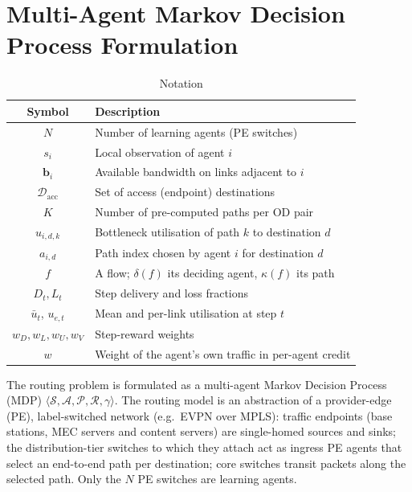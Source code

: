 \documentclass[10pt,journal,comsoc]{IEEEtran}
\begin{document}
\section{Multi-Agent Markov Decision Process Formulation} \label{model}

\begin{table}[!t]
  \centering
  \caption{Notation}
  \label{tab:mamdp_notation}
  \begin{tabular}{cl}
    \toprule
    \textbf{Symbol} & \textbf{Description} \\
    \midrule
    $N$ & Number of learning agents (PE switches) \\
    $s_i$ & Local observation of agent $i$ \\
    $\mathbf{b}_i$ & Available bandwidth on links adjacent to $i$ \\
    $\mathcal{D}_{\text{acc}}$ & Set of access (endpoint) destinations \\
    $K$ & Number of pre-computed paths per OD pair \\
    $u_{i,d,k}$ & Bottleneck utilisation of path $k$ to destination $d$ \\
    $a_{i,d}$ & Path index chosen by agent $i$ for destination $d$ \\
    $f$ & A flow; $\delta(f)$ its deciding agent, $\kappa(f)$ its path \\
    $D_t, L_t$ & Step delivery and loss fractions \\
    $\bar{u}_t$, $u_{e,t}$ & Mean and per-link utilisation at step $t$ \\
    $w_D,w_L,w_U,w_V$ & Step-reward weights \\
    $w$ & Weight of the agent's own traffic in per-agent credit \\
    \bottomrule
  \end{tabular}
\end{table}

The routing problem is formulated as a multi-agent Markov Decision Process (MDP) $\langle \mathcal{S}, \mathcal{A}, \mathcal{P}, \mathcal{R}, \gamma \rangle$. The routing model is an abstraction of a provider-edge (PE), label-switched network (e.g.\ EVPN over MPLS): traffic endpoints (base stations, MEC servers and content servers) are single-homed sources and sinks; the distribution-tier switches to which they attach act as ingress PE agents that select an end-to-end path per destination; core switches transit packets along the selected path. Only the $N$ PE switches are learning agents.
\end{document}

